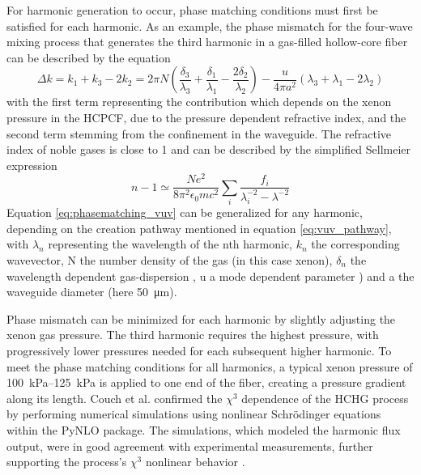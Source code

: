 For harmonic generation to occur, phase matching conditions must first be satisfied for each harmonic.
As an example, the phase mismatch for the four-wave mixing process that generates the third harmonic in a gas-filled hollow-core fiber can be described by the equation
\begin{equation}
	\Delta k = k_1 + k_3 - 2k_2 = 2\pi N \left( \frac{\delta_3}{\lambda_3} + \frac{\delta_1}{\lambda_1} - \frac{2\delta_2}{\lambda_2}\right) - \frac{u}{4\pi a^2} (\lambda_3 + \lambda_1 -2\lambda_2)
	\label{eq:phasematching_vuv}
\end{equation}
with the first term representing the contribution which depends on the xenon pressure in the HCPCF, due to the pressure dependent refractive index, and the second term stemming from the confinement in the waveguide.
The refractive index of noble gases is close to 1 and can be described by the simplified Sellmeier expression \cite{bideau-mehu_measurement_1981}
\begin{equation}
	n-1\simeq\frac{Ne^2}{8\pi^2\epsilon_0mc^2}\sum_{i}^{}\frac{f_i}{\lambda_i^{-2}-\lambda^{-2}}
\end{equation}
Equation \ref{eq:phasematching_vuv} can be generalized for any harmonic, depending on the creation pathway mentioned in equation \ref{eq:vuv_pathway}, with $\lambda_n$ representing the wavelength of the nth harmonic, $k_n$ the corresponding wavevector, N the number density of the gas (in this case xenon), $\delta_n$ the wavelength dependent gas-dispersion \cite{bideau-mehu_measurement_1981}, u a mode dependent parameter \cite{couch_ultrafast_2020,durfee_iii_guided-wave_1999}) and a the waveguide diameter (here \qty{50}{\micro\meter}). 

Phase mismatch can be minimized for each harmonic by slightly adjusting the xenon gas pressure.
The third harmonic requires the highest pressure, with progressively lower pressures needed for each subsequent higher harmonic.
To meet the phase matching conditions for all harmonics, a typical xenon pressure of \qtyrange{100}{125}{\kilo\pascal} is applied to one end of the fiber, creating a pressure gradient along its length.
Couch et al. \cite{couch_ultrafast_2020} confirmed the $\chi^3$ dependence of the HCHG process by performing numerical simulations using nonlinear Schrödinger equations within the PyNLO package.
The simulations, which modeled the harmonic flux output, were in good agreement with experimental measurements, further supporting the process's $\chi^3$ nonlinear behavior \cite{hult_fourth-order_2007,ycas_g_pynlopynlo_2024}.

